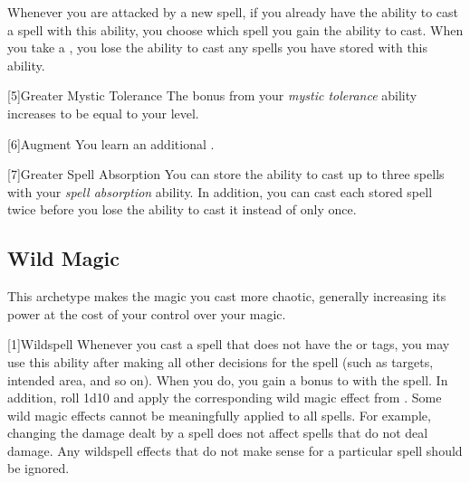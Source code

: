         Whenever you are attacked by a new spell, if you already have the ability to cast a spell with this ability, you choose which spell you gain the ability to cast.
        When you take a , you lose the ability to cast any spells you have stored with this ability.

        [5]{Greater Mystic Tolerance} The bonus from your \textit{mystic tolerance} ability increases to be equal to your level.

        [6]{Augment} You learn an additional .

        [7]{Greater Spell Absorption} You can store the ability to cast up to three spells with your \textit{spell absorption} ability.
        In addition, you can cast each stored spell twice before you lose the ability to cast it instead of only once.

    \subsection{Wild Magic}
        This archetype makes the magic you cast more chaotic, generally increasing its power at the cost of your control over your magic.

        [1]{Wildspell} Whenever you cast a spell that does not have the  or  tags, you may use this ability after making all other decisions for the spell (such as targets, intended area, and so on).
        When you do, you gain a  bonus to  with the spell.
        In addition, roll 1d10 and apply the corresponding wild magic effect from .
        Some wild magic effects cannot be meaningfully applied to all spells.
        For example, changing the damage dealt by a spell does not affect spells that do not deal damage.
        Any wildspell effects that do not make sense for a particular spell should be ignored.

